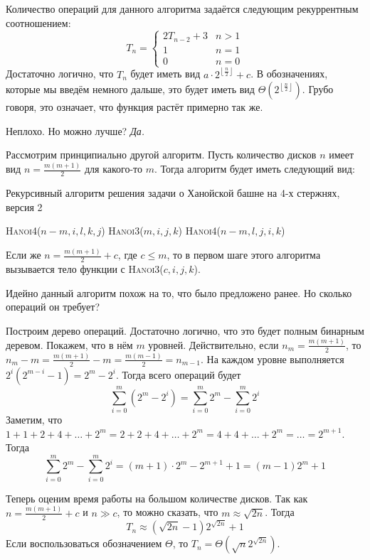 Количество операций для данного алгоритма задаётся следующим рекуррентным соотношением:
\[T_{n} = \begin{cases}
2T_{n - 2} + 3 & n > 1 \\
1 & n = 1 \\
0 & n = 0
\end{cases}\]
Достаточно логично, что \(T_{n}\) будет иметь вид \(a\cdot2^{\left\lfloor\frac{n}{2}\right\rfloor} + c\). В обозначениях, которые мы введём немного дальше, это будет иметь вид \(\Theta(2^{\left\lfloor\frac{n}{2}\right\rfloor})\). Грубо говоря, это означает, что функция растёт примерно так же.

Неплохо. Но можно лучше? \emph{Да.}

Рассмотрим принципиально другой алгоритм. Пусть количество дисков \(n\) имеет вид \(n = \frac{m(m + 1)}{2}\) для какого-то \(m\). Тогда алгоритм будет иметь следующий вид: 
\begin{algorithm}
	\caption{Рекурсивный алгоритм решения задачи о Ханойской башне на 4-х стержнях, версия 2}
	\begin{algorithmic}[1]
		\State \textsc{Hanoi4}($n-m,i,l,k,j$)
		\State \textsc{Hanoi3}($m,i,j,k$)
		\State \textsc{Hanoi4}($n-m,l,j,i,k$)
		\EndIf
		\EndFunction
	\end{algorithmic}
\end{algorithm}

Если же \(n = \frac{m(m + 1)}{2} + c\), где \(c \leqslant m\), то в первом шаге этого алгоритма вызывается тело функции с \textsc{Hanoi3}($c,i,j,k$).

Идейно данный алгоритм похож на то, что было предложено ранее. Но сколько операций он требует?

Построим дерево операций. Достаточно логично, что это будет полным бинарным деревом. Покажем, что в нём \(m\) уровней. Действительно, если \(n_{m} = \frac{m(m + 1)}{2}\), то \(n_{m} - m = \frac{m(m + 1)}{2} - m = \frac{m(m - 1)}{2} = n_{m - 1}\). На каждом уровне выполняется \(2^{i}(2^{m - i} - 1) = 2^{m} - 2^{i}\). Тогда всего операций будет \[\sum_{i = 0}^{m} (2^{m} - 2^{i}) = \sum_{i = 0}^{m} 2^{m} - \sum_{i = 0}^{m} 2^{i}\]
Заметим, что \(1 + 1 + 2 + 4 + \ldots + 2^m = 2 + 2 + 4 + \ldots + 2^m = 4 + 4 + \ldots + 2^m = \ldots = 2^{m + 1}\). Тогда 
\[\sum_{i = 0}^{m} 2^{m} - \sum_{i = 0}^{m} 2^{i} = (m + 1)\cdot2^{m} - 2^{m + 1} + 1 = (m - 1)2^{m} + 1\]

Теперь оценим время работы на большом количестве дисков. Так как \(n = \frac{m(m + 1)}{2} + c\) и \(n \gg c\), то можно сказать, что \(m \approx \sqrt{2n}\). Тогда \[T_n \approx (\sqrt{2n} - 1)2^{\sqrt{2n}} + 1\]
Если воспользоваться обозначением \(\Theta\), то \(T_n = \Theta(\sqrt{n}2^{\sqrt{2n}})\).

